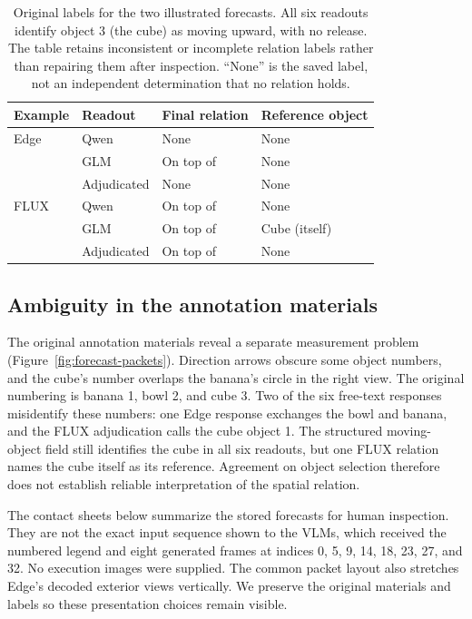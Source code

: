 \documentclass{article}
\begin{document}
\begin{table}[!ht]
\centering
\small
\begin{tabular}{llll}
\toprule
Example & Readout & Final relation & Reference object \\
\midrule
Edge & Qwen & None & None \\
     & GLM & On top of & None \\
     & Adjudicated & None & None \\
\midrule
FLUX & Qwen & On top of & None \\
     & GLM & On top of & Cube (itself) \\
     & Adjudicated & On top of & None \\
\bottomrule
\end{tabular}
\caption{Original labels for the two illustrated forecasts. All six readouts identify object 3 (the cube) as moving upward, with no release. The table retains inconsistent or incomplete relation labels rather than repairing them after inspection. ``None'' is the saved label, not an independent determination that no relation holds.}
\label{tab:forecast-example-labels}
\end{table}

\FloatBarrier
\subsection{Ambiguity in the annotation materials}
\label{app:forecast-packets}

The original annotation materials reveal a separate measurement problem (Figure~\ref{fig:forecast-packets}). Direction arrows obscure some object numbers, and the cube's number overlaps the banana's circle in the right view. The original numbering is banana 1, bowl 2, and cube 3. Two of the six free-text responses misidentify these numbers: one Edge response exchanges the bowl and banana, and the FLUX adjudication calls the cube object 1. The structured moving-object field still identifies the cube in all six readouts, but one FLUX relation names the cube itself as its reference. Agreement on object selection therefore does not establish reliable interpretation of the spatial relation.

The contact sheets below summarize the stored forecasts for human inspection. They are not the exact input sequence shown to the VLMs, which received the numbered legend and eight generated frames at indices 0, 5, 9, 14, 18, 23, 27, and 32. No execution images were supplied. The common packet layout also stretches Edge's decoded exterior views vertically. We preserve the original materials and labels so these presentation choices remain visible.
\end{document}
